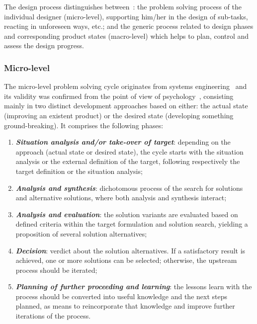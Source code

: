 The design process distinguishes between~\cite{gausemeier2003new}: the problem
solving process of the individual designer (micro-level), supporting him/her in
the design of sub-tasks, reacting in unforeseen ways, etc.; and the generic
process related to design phases and corresponding product states (macro-level)
which helps to plan, control and assess the design progress.

\subsubsection{Micro-level}
The micro-level problem solving cycle originates from systems engineering~\cite{daenzer1994systems} and its validity
was confirmed from the point of view of psychology~\cite{von1986group},
consisting mainly in two distinct development approaches based on either: the
actual state (improving an existent product) or the desired state (developing
something ground-breaking). It comprises the following phases:
\begin{enumerate}
  \item \textbf{\emph{Situation analysis and/or take-over of target}}: depending
    on the approach (actual state or desired state), the cycle starts with the
    situation analysis or the external definition of the target, following
    respectively the target definition or the situation analysis;
  \item \textbf{\emph{Analysis and synthesis}}: dichotomous process of the search
    for solutions and alternative solutions, where both analysis and synthesis
    interact;
  \item \textbf{\emph{Analysis and evaluation}}: the solution variants are
    evaluated based on defined criteria within the target formulation and
    solution search, yielding a proposition of several solution alternatives;
  \item \textbf{\emph{Decision}}: verdict about the solution alternatives. If a
    satisfactory result is achieved, one or more solutions can be selected;
    otherwise, the upstream process should be iterated;
  \item \textbf{\emph{Planning of further proceeding and learning}}: the lessons
    learn with the process should be converted into useful knowledge and the
    next steps planned, as means to reincorporate that knowledge and improve further
    iterations of the process.
\end{enumerate}
%

